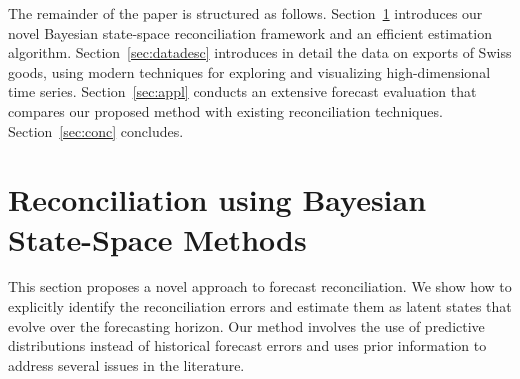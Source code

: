 \documentclass[a4paper,fleqn,11pt]{article}
\begin{document}
The remainder of the paper is structured as follows. Section~\ref{sec:model} introduces our novel Bayesian state-space reconciliation framework and an efficient estimation algorithm.  Section~\ref{sec:datadesc} introduces in detail the data on exports of Swiss goods, using modern techniques for exploring and visualizing high-dimensional time series.  Section~\ref{sec:appl} conducts an extensive forecast evaluation that compares our proposed method with existing reconciliation techniques. Section~\ref{sec:conc} concludes.






\section{Reconciliation using Bayesian State-Space Methods}\label{sec:model}

This section proposes a novel approach to forecast reconciliation. We show how to explicitly identify the reconciliation errors and estimate them as latent states that evolve over the forecasting horizon. Our method involves the use of predictive distributions instead of historical forecast errors and uses prior information to address several issues in the literature. 
\end{document}
